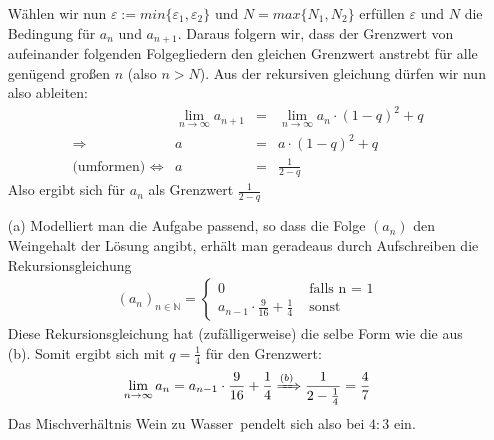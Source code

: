 \documentclass{scrreprt}
\newcommand{\NN}{\mathbb{N}}
\begin{document}
\begin{enumerate}[(a)]
			Wählen wir nun $\varepsilon := min\lbrace \varepsilon_1, \varepsilon_2 \rbrace$ und $N = max \lbrace N_1, N_2\rbrace$ erfüllen $\varepsilon$ und $N$ die Bedingung für $a_n$ und $a_{n+1}$. Daraus folgern wir, dass der Grenzwert von aufeinander folgenden Folgegliedern den gleichen Grenzwert anstrebt für alle genügend großen $n$ (also $n > N$). Aus der rekursiven gleichung dürfen wir nun also ableiten:
			\begin{align*}
				&\lim\limits_{n \to \infty} a_{n+1} & =& \lim\limits_{n \to \infty} a_n \cdot (1-q)^2 + q\\
				\Rightarrow & a & =& a \cdot (1-q)^2 + q\\
				\text{(umformen) }\Leftrightarrow & a & = & \frac{1}{2-q} 
			\end{align*}
			Also ergibt sich für $a_n$ als Grenzwert $\frac{1}{2-q}$
		\item[(a)]
			Modelliert man die Aufgabe passend, so dass die Folge $(a_n)$ den Weingehalt der Lösung angibt, erhält man geradeaus durch Aufschreiben die Rekursionsgleichung
			\begin{align*}
				(a_n)_{n \in \NN} = \begin{cases}0 &\text{ falls n = 1} \\ a_{n-1} \cdot \frac{9}{16} + \frac{1}{4} &\text{ sonst}\end{cases}
			\end{align*}
			Diese Rekursionsgleichung hat (zufälligerweise) die selbe Form wie die aus (b). Somit ergibt sich mit $q = \frac{1}{4}$ für den Grenzwert:
			\begin{align*}
				\lim\limits_{n \to \infty} a_n = a_{n-1} \cdot \frac{9}{16} + \frac{1}{4} \xRightarrow{(b)} \frac{1}{2-\frac{1}{4}} = \frac{4}{7} 
			\end{align*}
			Das Mischverhältnis \glqq Wein zu Wasser\grqq\  pendelt sich also bei $4:3$ ein.
	\end{enumerate}
\end{document}
